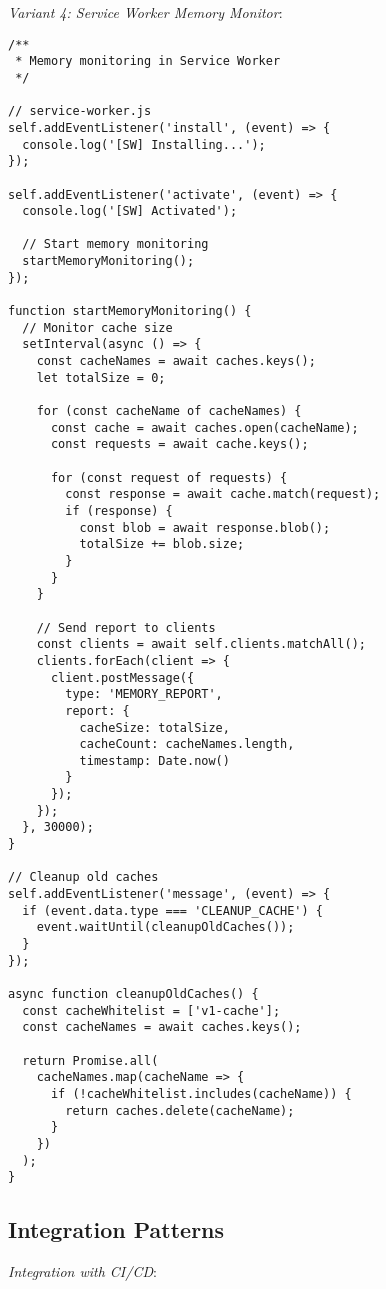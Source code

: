 \documentclass[11pt]{article}
\begin{document}
\emph{Variant 4: Service Worker Memory Monitor}:

\begin{verbatim}
/**
 * Memory monitoring in Service Worker
 */

// service-worker.js
self.addEventListener('install', (event) => {
  console.log('[SW] Installing...');
});

self.addEventListener('activate', (event) => {
  console.log('[SW] Activated');
  
  // Start memory monitoring
  startMemoryMonitoring();
});

function startMemoryMonitoring() {
  // Monitor cache size
  setInterval(async () => {
    const cacheNames = await caches.keys();
    let totalSize = 0;
    
    for (const cacheName of cacheNames) {
      const cache = await caches.open(cacheName);
      const requests = await cache.keys();
      
      for (const request of requests) {
        const response = await cache.match(request);
        if (response) {
          const blob = await response.blob();
          totalSize += blob.size;
        }
      }
    }
    
    // Send report to clients
    const clients = await self.clients.matchAll();
    clients.forEach(client => {
      client.postMessage({
        type: 'MEMORY_REPORT',
        report: {
          cacheSize: totalSize,
          cacheCount: cacheNames.length,
          timestamp: Date.now()
        }
      });
    });
  }, 30000);
}

// Cleanup old caches
self.addEventListener('message', (event) => {
  if (event.data.type === 'CLEANUP_CACHE') {
    event.waitUntil(cleanupOldCaches());
  }
});

async function cleanupOldCaches() {
  const cacheWhitelist = ['v1-cache'];
  const cacheNames = await caches.keys();
  
  return Promise.all(
    cacheNames.map(cacheName => {
      if (!cacheWhitelist.includes(cacheName)) {
        return caches.delete(cacheName);
      }
    })
  );
}
\end{verbatim}
\subsection{Integration Patterns}
\label{sec:org9035ae6}

\emph{Integration with CI/CD}:
\end{document}
